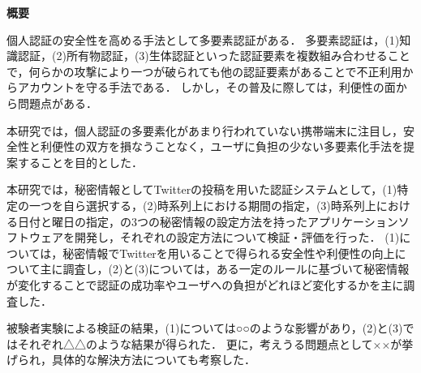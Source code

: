 \thispagestyle{empty}

\noindent
\begin{center}
\LARGE \bf 概要\\
\end{center}

\vspace{1.0cm}
{\small}
\normalsize

個人認証の安全性を高める手法として多要素認証がある．
多要素認証は，(1)知識認証，(2)所有物認証，(3)生体認証といった認証要素を複数組み合わせることで，何らかの攻撃により一つが破られても他の認証要素があることで不正利用からアカウントを守る手法である．
しかし，その普及に際しては，利便性の面から問題点がある．

本研究では，個人認証の多要素化があまり行われていない携帯端末に注目し，安全性と利便性の双方を損なうことなく，ユーザに負担の少ない多要素化手法を提案することを目的とした．

本研究では，秘密情報としてTwitterの投稿を用いた認証システムとして，(1)特定の一つを自ら選択する，(2)時系列上における期間の指定，(3)時系列上における日付と曜日の指定，の3つの秘密情報の設定方法を持ったアプリケーションソフトウェアを開発し，それぞれの設定方法について検証・評価を行った．
(1)については，秘密情報でTwitterを用いることで得られる安全性や利便性の向上について主に調査し，(2)と(3)については，ある一定のルールに基づいて秘密情報が変化することで認証の成功率やユーザへの負担がどれほど変化するかを主に調査した．

被験者実験による検証の結果，(1)については○○のような影響があり，(2)と(3)ではそれぞれ△△のような結果が得られた．
更に，考えうる問題点として××が挙げられ，具体的な解決方法についても考察した．



\newpage

